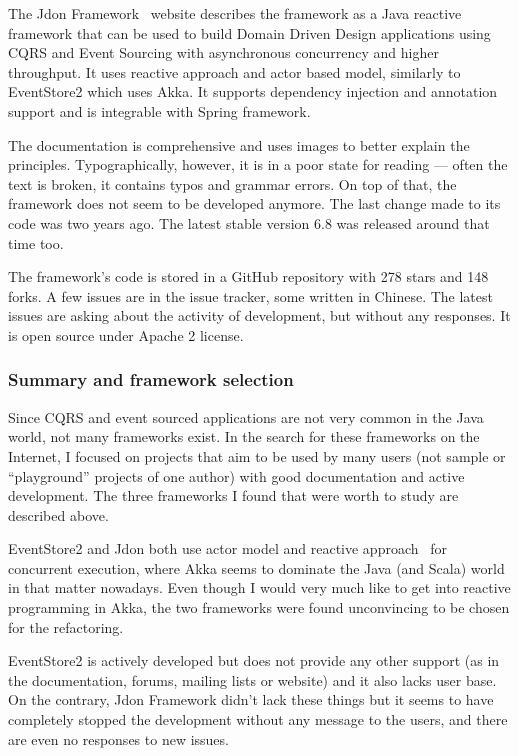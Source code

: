 \documentclass{book}
\begin{document}
The Jdon Framework~\cite{jdon} website describes the framework as a Java
reactive framework that can be used to build Domain Driven Design
applications using CQRS and Event Sourcing with asynchronous concurrency
and higher throughput. It uses reactive approach and actor based model,
similarly to EventStore2 which uses Akka. It supports dependency
injection and annotation support and is integrable with Spring
framework.

The documentation is comprehensive and uses images to better explain the
principles. Typographically, however, it is in a poor state for reading
--- often the text is broken, it contains typos and grammar errors. On
top of that, the framework does not seem to be developed anymore. The
last change made to its code was two years ago. The latest stable
version 6.8 was released around that time too.

The framework's code is stored in a GitHub repository with 278 stars and
148 forks. A few issues are in the issue tracker, some written in
Chinese. The latest issues are asking about the activity of development,
but without any responses. It is open source under Apache 2 license.

\subsubsection{Summary and framework
selection}\label{summary-and-framework-selection}

Since CQRS and event sourced applications are not very common in the
Java world, not many frameworks exist. In the search for these
frameworks on the Internet, I focused on projects that aim to be used by
many users (not sample or ``playground'' projects of one author) with
good documentation and active development. The three frameworks I found
that were worth to study are described above.

EventStore2 and Jdon both use actor model and reactive approach~\cite{actor} for concurrent execution, where Akka seems to dominate the
Java (and Scala) world in that matter nowadays. Even though I would very
much like to get into reactive programming in Akka, the two frameworks
were found unconvincing to be chosen for the refactoring.

EventStore2 is actively developed but does not provide any other support
(as in the documentation, forums, mailing lists or website) and it also
lacks user base. On the contrary, Jdon Framework didn't lack these
things but it seems to have completely stopped the development without
any message to the users, and there are even no responses to new issues.
\end{document}
